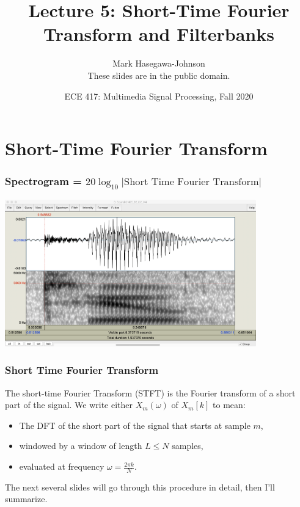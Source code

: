 \documentclass{beamer}
\title{Lecture 5: Short-Time Fourier Transform and Filterbanks}
\author{Mark Hasegawa-Johnson\\These slides are in the public domain.}
\date{ECE 417: Multimedia Signal Processing, Fall 2020}
\begin{document}
\begin{frame}
  \maketitle
\end{frame}

\begin{frame}
  \tableofcontents
\end{frame}

\section[STFT]{Short-Time Fourier Transform}
\setcounter{subsection}{1}

\begin{frame}
  \frametitle{Spectrogram = $20\log_{10}|\mbox{Short Time Fourier Transform}|$}
  \centerline{\includegraphics[height=2.5in]{CM05_B2_D2_M4.png}}
\end{frame}

\begin{frame}
  \frametitle{Short Time Fourier Transform}


  The short-time Fourier Transform (STFT) is the Fourier transform of
  a short part of the signal.
  We write either $X_m(\omega)$  of $X_m[k]$ to mean:
  \begin{itemize}
  \item The DFT of the short part of the signal that starts at sample $m$,
  \item windowed by a window of length $L\le N$ samples,
  \item evaluated at frequency $\omega=\frac{2\pi k}{N}$.
  \end{itemize}
  The next several slides will go through this procedure in detail,
  then I'll summarize.
\end{frame}
\end{document}
